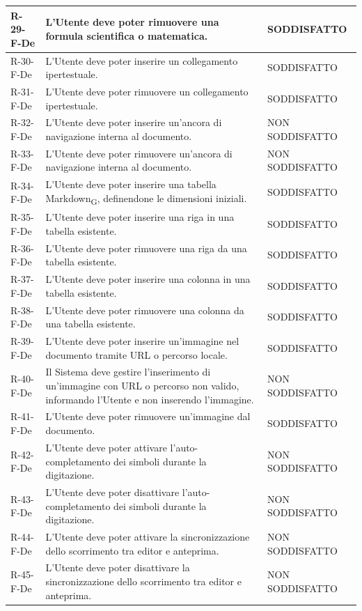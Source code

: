 \documentclass[a4paper, 10pt]{article}
\begin{document}
\begin{longtable}{|p{2.1cm}|p{9.6cm}|p{2.6cm}|}
    R-29-F-De & L'Utente deve poter rimuovere una formula scientifica o matematica. & SODDISFATTO \\ \hline
    R-30-F-De & L'Utente deve poter inserire un collegamento ipertestuale. & SODDISFATTO \\ \hline
    R-31-F-De & L'Utente deve poter rimuovere un collegamento ipertestuale. & SODDISFATTO \\ \hline
    R-32-F-De & L'Utente deve poter inserire un'ancora di navigazione interna al documento. & NON SODDISFATTO \\ \hline
    R-33-F-De & L'Utente deve poter rimuovere un'ancora di navigazione interna al documento. & NON SODDISFATTO \\ \hline
    R-34-F-De & L'Utente deve poter inserire una tabella Markdown\textsubscript{G}, definendone le dimensioni iniziali. & SODDISFATTO \\ \hline
    R-35-F-De & L'Utente deve poter inserire una riga in una tabella esistente. & SODDISFATTO \\ \hline
    R-36-F-De & L'Utente deve poter rimuovere una riga da una tabella esistente. & SODDISFATTO \\ \hline
    R-37-F-De & L'Utente deve poter inserire una colonna in una tabella esistente. & SODDISFATTO \\ \hline
    R-38-F-De & L'Utente deve poter rimuovere una colonna da una tabella esistente. & SODDISFATTO \\ \hline
    R-39-F-De & L'Utente deve poter inserire un'immagine nel documento tramite URL o percorso locale. & SODDISFATTO \\ \hline
    R-40-F-De & Il Sistema deve gestire l'inserimento di un'immagine con URL o percorso non valido, informando l'Utente e non inserendo l'immagine. & NON SODDISFATTO \\ \hline
    R-41-F-De & L'Utente deve poter rimuovere un'immagine dal documento. & SODDISFATTO \\ \hline
    R-42-F-De & L'Utente deve poter attivare l'auto-completamento dei simboli durante la digitazione. & NON SODDISFATTO \\ \hline
    R-43-F-De & L'Utente deve poter disattivare l'auto-completamento dei simboli durante la digitazione. & NON SODDISFATTO \\ \hline
    R-44-F-De & L'Utente deve poter attivare la sincronizzazione dello scorrimento tra editor e anteprima. & NON SODDISFATTO \\ \hline
    R-45-F-De & L'Utente deve poter disattivare la sincronizzazione dello scorrimento tra editor e anteprima. & NON SODDISFATTO \\ \hline

\end{longtable}
\end{document}
